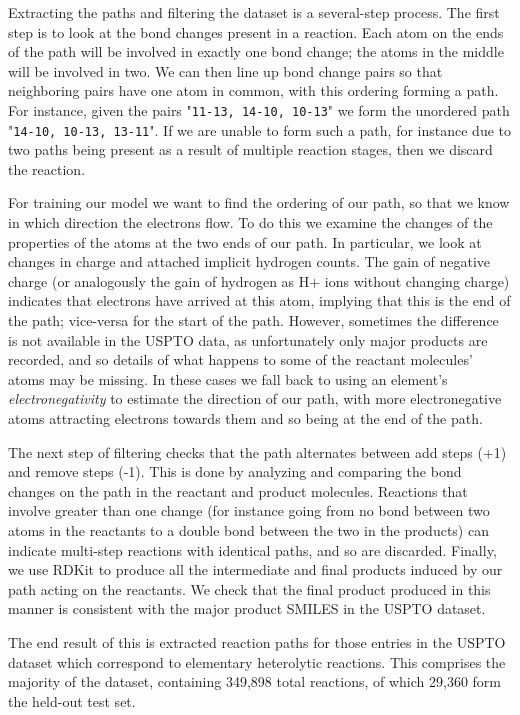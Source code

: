 Extracting the paths and filtering the dataset is a several-step process.
The first step is to look at the bond changes present in a reaction. 
Each atom on the ends of the path will be involved in exactly one bond change;
the atoms in the middle will be involved in two. 
We can then line up bond change pairs so that neighboring pairs have one atom in common,
 with this ordering forming a path.
For instance, given the pairs "\texttt{11-13, 14-10, 10-13}" we form the unordered path "\texttt{14-10, 10-13, 13-11}".
If we are unable to form such a path, for instance due to two paths being present as a result of multiple reaction stages, then we discard the reaction.

For training our model we want to find the ordering of our path, so that we know in which direction the electrons flow.
To do this we examine the changes of the properties of the atoms at the two ends of our path. 
In particular, we look at changes in charge and attached implicit hydrogen counts. 
The gain of negative charge (or analogously the gain of hydrogen as H+ ions without changing charge) indicates that electrons have arrived at this atom, 
implying that this is the end of the path; 
vice-versa for the start of the path.
However, sometimes the difference is not available in the USPTO data, as unfortunately only major products are recorded, and so details of what happens to some of the reactant molecules' atoms may be missing.
In these cases we fall back to using an element's {\em electronegativity} to estimate the direction of our path, with more electronegative atoms attracting electrons towards them and so being at the end of the path. 

The next step of filtering checks that the path alternates between add steps (+1) and remove steps (-1). 
This is done by analyzing and comparing the bond changes on the path in the reactant and product molecules. 
Reactions that involve greater than one change (for instance going from no bond between two atoms in the reactants to a double bond between the two in the products) can indicate multi-step 
reactions with identical paths, and so are discarded.
Finally, we use RDKit to produce all the intermediate and final products induced by our path acting on the reactants.
We check that the final product produced in this manner is consistent with the major product SMILES in the USPTO dataset.

The end result of this is extracted reaction paths for those entries in the USPTO dataset which 
correspond to elementary heterolytic reactions.
This comprises the majority of the dataset, containing 349,898 total reactions, of which 29,360 form the held-out test set.


